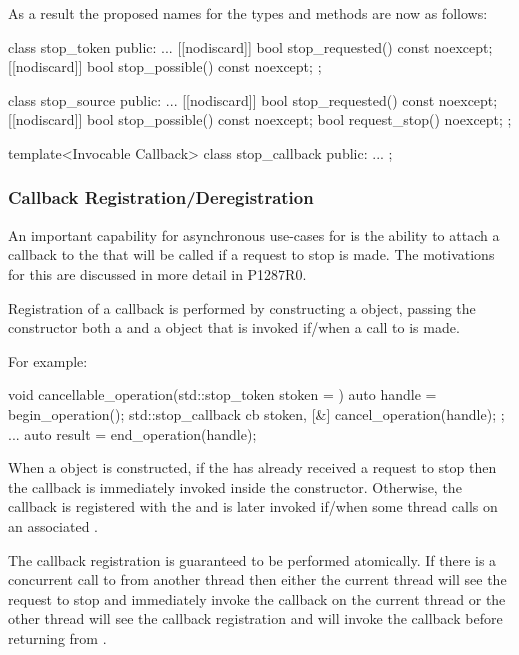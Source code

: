 As a result the proposed names for the types and methods are now as follows:
\begin{codeblock}
class stop_token {
 public:
  ...
  [[nodiscard]] bool stop_requested() const noexcept;
  [[nodiscard]] bool stop_possible() const noexcept;
};

class stop_source {
 public:
  ...
  [[nodiscard]] bool stop_requested() const noexcept;
  [[nodiscard]] bool stop_possible() const noexcept;
  bool request_stop() noexcept;
};

template<Invocable Callback>
class stop_callback {
 public:
  ...
};
\end{codeblock}

\subsubsection*{Callback Registration/Deregistration}

An important capability for asynchronous use-cases for  is the ability to attach
a callback to the  that will be called if a request to stop is made. The motivations
for this are discussed in more detail in P1287R0.

Registration of a callback is performed by constructing a  object,
passing the constructor both a  and a  object that
is invoked if/when a call to  is made.

For example:
\begin{codeblock}
void cancellable_operation(std::stop_token stoken = {})
{
  auto handle = begin_operation();
  std::stop_callback cb{ stoken, [&] { cancel_operation(handle); }};
  ...
  auto result = end_operation(handle);
}
\end{codeblock}

When a  object is constructed, if the  has
already received a request to stop then the callback is immediately invoked inside
the constructor. Otherwise, the callback is registered with the 
and is later invoked if/when some thread calls 
on an associated .

The callback registration is guaranteed to be performed atomically. If there is a
concurrent call to  from another thread then either the
current thread will see the request to stop and immediately invoke the callback
on the current thread or the other thread will see the callback registration and
will invoke the callback before returning from .

